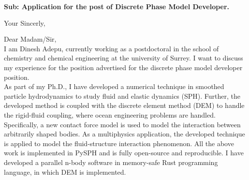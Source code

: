 \documentclass[11pt,a4paper,roman]{moderncv}
\begin{document}
\date{\today}
\opening{\textbf{Sub: Application for the post of Discrete Phase Model Developer.}}
\closing{Your Sincerly, \vspace{-1em}}


\makelettertitle



Dear Madam/Sir,
\\
\vspace{1em} I am Dinesh Adepu, currently working as a postdoctoral in the
school of chemistry and chemical engineering at the university of Surrey.  I
want to discuss my experience for the position advertised for the discrete phase
model developer position. \\

\vspace{1em} As part of my Ph.D., I have developed a numerical technique in
smoothed particle hydrodynamics to study fluid and elastic dynamics (SPH). Further,
the developed method is coupled with the discrete element method (DEM) to handle the
rigid-fluid coupling, where ocean engineering problems are handled.
Specifically, a new contact force model is used to model the interaction between
arbitrarily shaped bodies. As a multiphysics application, the developed
technique is applied to model the fluid-structure interaction phenomenon. All
the above work is implemented in PySPH and is fully open-source and
reproducible. I have developed a parallel n-body software in memory-safe Rust
programming language, in which DEM is implemented.\\
\end{document}
